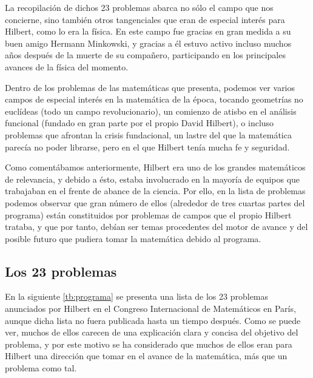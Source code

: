 La recopilación de dichos 23 problemas abarca no sólo el campo que nos concierne, sino también otros tangenciales que eran de especial 
interés para Hilbert, como lo era la física. En este campo fue gracias en gran medida a su buen amigo Hermann Minkowski,
y gracias a él estuvo activo incluso muchos años después de la muerte de su compañero, participando en los principales avances de la física del momento.

Dentro de los problemas de las matemáticas que presenta, podemos ver varios campos de especial interés en la matemática de la época, tocando geometrías no euclídeas
(todo un campo revolucionario), un comienzo de atisbo en el análisis funcional (fundado en gran parte por el propio David Hilbert),
o incluso problemas que afrontan la crisis fundacional, un lastre del que la matemática parecía no poder librarse, pero en el que Hilbert 
tenía mucha fe y seguridad.

Como comentábamos anteriormente, Hilbert era uno de los grandes matemáticos de relevancia, y debido a ésto, estaba involucrado en la mayoría de equipos
que trabajaban en el frente de abance de la ciencia. Por ello, en la lista de problemas podemos observar que gran número de ellos (alrededor de tres cuartas partes del
programa) están constituidos por problemas de campos que el propio Hilbert trataba, y que por tanto, debían ser temas procedentes del motor de avance
y del posible futuro que pudiera tomar la matemática debido al programa. 

  
\subsection{Los 23 problemas}

En la siguiente \autoref{tb:programa} se presenta una lista de los 23 problemas anunciados por Hilbert en el Congreso Internacional de Matemáticos en París,
aunque dicha lista no fuera publicada hasta un tiempo después. Como se puede ver, muchos de ellos carecen de una explicación clara y concisa del objetivo del problema,
y por este motivo se ha considerado que muchos de ellos eran para Hilbert una dirección que tomar en el avance de la matemática, más que un problema como tal.

